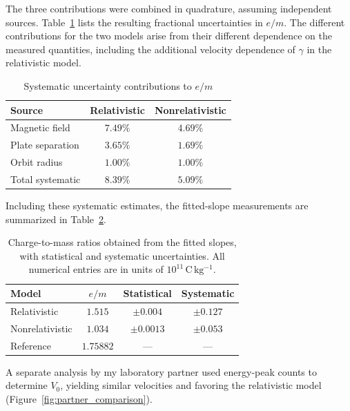 The three contributions were combined in quadrature, assuming independent
sources. Table~\ref{tab:systematic_budget} lists the resulting fractional
uncertainties in $e/m$. The different contributions for the two models
arise from their different dependence on the measured quantities,
including the additional velocity dependence of $\gamma$ in the
relativistic model.

\FloatBarrier
\begin{table}[htbp]
    \centering
    \begin{tabular}{lcc}
        \hline
        Source & Relativistic & Nonrelativistic \\
        \hline
        Magnetic field   & $7.49\%$ & $4.69\%$ \\
        Plate separation & $3.65\%$ & $1.69\%$ \\
        Orbit radius     & $1.00\%$ & $1.00\%$ \\
        \hline
        Total systematic & $8.39\%$ & $5.09\%$ \\
        \hline
    \end{tabular}
    \caption{Systematic uncertainty contributions to $e/m$}
    \label{tab:systematic_budget}
\end{table}

Including these systematic estimates, the fitted-slope measurements
are summarized in Table~\ref{tab:em_final}.

\begin{table}[htbp]
    \centering
    \begin{tabular}{lccc}
        \hline
        Model & $e/m$ & Statistical & Systematic \\
        \hline
        Relativistic    & $1.515$ & $\pm0.004$  & $\pm0.127$ \\
        Nonrelativistic & $1.034$ & $\pm0.0013$ & $\pm0.053$ \\
        Reference      & $1.75882$ & --- & --- \\
        \hline
    \end{tabular}
    \caption{Charge-to-mass ratios obtained from the fitted slopes,
    with statistical and systematic uncertainties.
    All numerical entries are in units of
    $10^{11}\,\mathrm{C\,kg^{-1}}$.}
    \label{tab:em_final}
\end{table}

A separate analysis by my laboratory partner used energy-peak
counts to determine $V_0$, yielding similar velocities and favoring
the relativistic model (Figure~\ref{fig:partner_comparison}).

